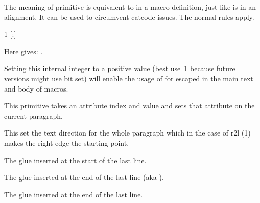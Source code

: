 \stopnewprimitive

\startnewprimitive[title={\prm {parametermark}}]

The meaning of primitive  is equivalent to \type {#} in a
macro definition, just like  is in an alignment. It can be used
to circumvent catcode issues. The normal 
rules apply.

\startbuffer
\def\foo\parametermark1%
  {\def\oof\parametermark{}%
     {[:\parametermark{}]}}
\stopbuffer

\typebuffer \getbuffer

Here \type {\foo{X}\oof{Y}} gives: \foo{X}.

\stopnewprimitive

\startnewprimitive[title={\prm {parametermode}}]

Setting this internal integer to a positive value (best use~1 because future
versions might use bit set) will enable the usage of \type {#} for escaped in the
main text and body of macros.

\stopnewprimitive

\startnewprimitive[title={\prm {parattribute}}]

This primitive takes an attribute index and value and sets that attribute on the
current paragraph.

\stopnewprimitive

\startnewprimitive[title={\prm {pardirection}}]

This set the text direction for the whole paragraph which in the case of \type
{r2l} (1) makes the right edge the starting point.

\stopnewprimitive

\startnewprimitive[title={\prm {parfillleftskip}}]

The glue inserted at the start of the last line.

\stopnewprimitive

\startnewprimitive[title={\prm {parfillrightskip}}]

The glue inserted at the end of the last line (aka ).

\stopnewprimitive

\startoldprimitive[title={\prm {parfillskip}}]

The glue inserted at the end of the last line.

\stopoldprimitive

\startoldprimitive[title={\prm {parindent}}]

